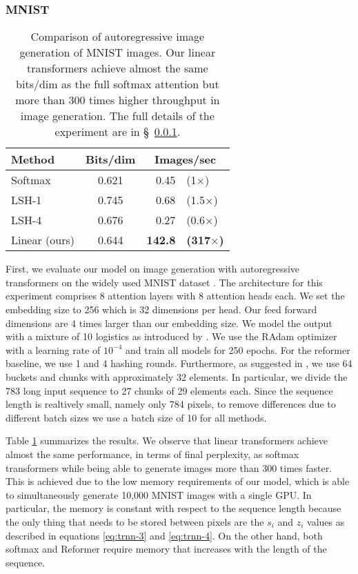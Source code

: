 \documentclass{article}
\begin{document}
\subsubsection{MNIST} \label{sec:exp-mnist}

\bgroup
\renewcommand{\arraystretch}{1.1}
\begin{table}
    \begin{center}
    \begin{tabular}{lcrl}
        Method & Bits/dim & \multicolumn{2}{c}{Images/sec}\\
        \hline
        Softmax & 0.621 & 0.45 & (1$\times$) \\
        LSH-1 & 0.745 & 0.68 & (1.5$\times$) \\
        LSH-4 & 0.676 & 0.27 & (0.6$\times$) \\
        \hline
        Linear (ours) & 0.644 & \textbf{142.8} & \textbf{(317$\times$)}
    \end{tabular}
    \end{center}
    \caption{Comparison of autoregressive image generation of MNIST images. Our
             linear transformers achieve almost the same bits/dim as the full
             softmax attention but more than 300 times higher throughput in
             image generation. The full details of the experiment are in
             \S~\ref{sec:exp-mnist}.}
    \label{tab:mnist}
\end{table}
\egroup

First, we evaluate our model on image generation with autoregressive
transformers on the widely used MNIST dataset \cite{lecun2010mnist}. The
architecture for this experiment comprises 8 attention layers with 8 attention
heads each. We set the embedding size to 256 which is 32 dimensions per head.
Our feed forward dimensions are 4 times larger than our embedding size. We
model the output with a mixture of 10 logistics as introduced by
\citet{salimans2017pixelcnn++}. We use the RAdam optimizer with a learning rate
of $10^{-4}$ and train all models for 250 epochs. For the reformer baseline, we
use 1 and 4 hashing rounds. Furthermore, as suggested in
\citet{kitaev2020reformer}, we use 64 buckets and chunks with approximately 32
elements. In particular, we divide the 783 long input sequence to 27 chunks of
29 elements each. Since the sequence length is realtively small, namely only
784 pixels, to remove differences due to different batch sizes we use a batch
size of 10 for all methods.

Table \ref{tab:mnist} summarizes the results. We observe that linear
transformers achieve almost the same performance, in terms of final perplexity,
as softmax transformers while being able to generate images more than 300 times
faster. This is achieved due to the low memory requirements of our model, which
is able to simultaneously generate 10,000 MNIST images with a single GPU. In
particular, the memory is constant with respect to the sequence length because
the only thing that needs to be stored between pixels are the $s_i$ and $z_i$
values as described in equations \ref{eq:trnn-3} and \ref{eq:trnn-4}. On the
other hand, both softmax and Reformer require memory that increases with the
length of the sequence.
\end{document}

